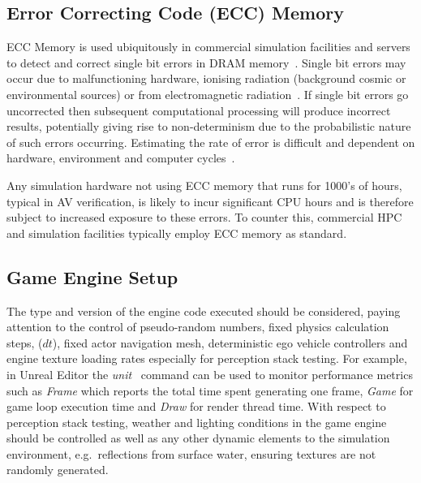 \subsection{Error Correcting Code (ECC) Memory}
ECC Memory is used ubiquitously in commercial simulation facilities and servers to detect and correct single bit errors in DRAM memory~\cite{Dell1997}. Single bit errors may occur due to malfunctioning hardware, ionising radiation (background cosmic or environmental sources) or from electromagnetic radiation~\cite{dodd2003basic}. If single bit errors go uncorrected then subsequent computational processing will produce incorrect results, potentially giving rise to non-determinism due to the probabilistic nature of such errors occurring. Estimating the rate of error is difficult and dependent on hardware, environment and computer cycles~\cite{mielke2008bit}.

Any simulation hardware not using ECC memory that runs for 1000's of hours, typical in AV verification, is likely to incur significant CPU hours and is therefore subject to increased exposure to these errors. To counter this, commercial HPC and simulation facilities typically employ ECC memory as standard.




\subsection{Game Engine Setup}
The type and version of the engine code executed should be considered, paying attention to the control of pseudo-random numbers, fixed physics calculation steps, ($dt$), fixed actor navigation mesh, deterministic ego vehicle controllers and engine texture loading rates especially for perception stack testing. 
%
For example, in Unreal Editor the \textit{unit}~\cite{stat_commands} command can be used to monitor performance metrics such as \textit{Frame} which reports the total time spent generating one frame, \textit{Game} for game loop execution time and \textit{Draw} for render thread time. 
%
With respect to perception stack testing, weather and lighting conditions in the game engine should be controlled as well as any other dynamic elements to the simulation environment, e.g.\ reflections from surface water, ensuring textures are not randomly generated. 






